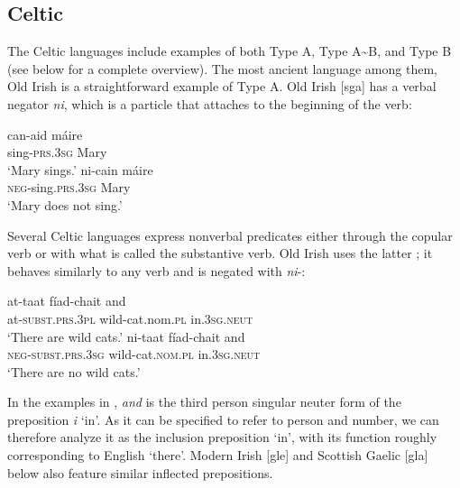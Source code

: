﻿\documentclass[output=paper]{langsci/langscibook}
\begin{document}
\subsection{Celtic}\label{sec:ieur-4.6}

The Celtic languages include examples of both Type A, Type
A{\textasciitilde}B, and Type B (see  below
for a complete overview). The most ancient language among them, Old
Irish is a straightforward example of Type A. Old Irish [sga] has a verbal negator \textit{ni}, which is a particle that attaches to the beginning of the verb: 
%
\begin{exe}\ex\label{ex:ieur-oldirish-sing}
\begin{xlist}
\ex\gll can-aid máire \\
sing-\textsc{prs.3sg} Mary \\
    \glt `Mary sings.'
\ex\gll ni-cain máire\\
\textsc{neg}-sing.\textsc{prs.3sg} Mary\\
\glt `Mary does not sing.'
\end{xlist}\end{exe}
%
Several Celtic languages express nonverbal predicates either through the
copular verb or with what is called the substantive verb. Old Irish uses
the latter \parencite[39ff]{McCone2005}; it behaves similarly to any verb and is negated with \textit{ni}-:
%
\begin{exe}\ex\label{ex:ieur-oldirish-wildcats}
\begin{xlist}
\ex\gll at-taat fíad-chait and \\
at-\textsc{subst}.\textsc{prs}.\textsc{3pl}    wild-cat.nom.\textsc{pl} in.\textsc{3sg.neut} \\
    \glt `There are wild cats.'
\ex\gll ni-taat fíad-chait and\\
\textsc{neg}-\textsc{subst}.\textsc{prs}.\textsc{3sg}
wild-cat.\textsc{nom}.\textsc{pl} in.\textsc{3sg.neut}\\
\glt `There are no wild cats.'
\end{xlist}\end{exe}
%
In the examples in , \textit{and} is the
third person singular neuter form of the preposition \textit{i} `in'. As it
can be specified to refer to person and number, we can therefore analyze it
as the inclusion preposition `in', with its function roughly corresponding
to English `there'. Modern Irish [gle] and Scottish
Gaelic [gla] below also feature similar inflected prepositions.
\end{document}
